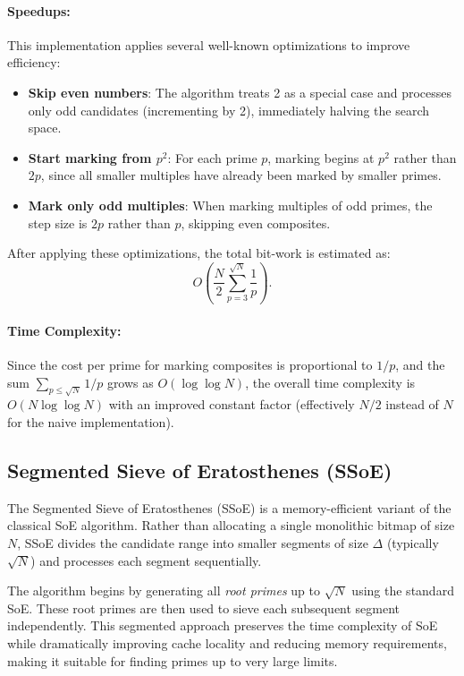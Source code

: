 \documentclass{article}
\begin{document}
\paragraph{Speedups:}
This implementation applies several well-known optimizations to improve efficiency:
\begin{itemize}[noitemsep]
    \item \textbf{Skip even numbers}: The algorithm treats 2 as a special case and processes only odd candidates (incrementing by 2), immediately halving the search space.
    \item \textbf{Start marking from $p^2$}: For each prime $p$, marking begins at $p^2$ rather than $2p$, since all smaller multiples have already been marked by smaller primes.
    \item \textbf{Mark only odd multiples}: When marking multiples of odd primes, the step size is $2p$ rather than $p$, skipping even composites.
\end{itemize}

After applying these optimizations, the total bit-work is estimated as:
\[
O\left(\frac{N}{2}\sum_{p=3}^{\sqrt N}\frac{1}{p}\right).
\]

\paragraph{Time Complexity:} Since the cost per prime for marking composites is proportional to $1/p$, and the sum $\sum_{p \le \sqrt{N}} 1/p$ grows as $O(\log \log N)$, the overall time complexity is $O(N \log \log N)$ with an improved constant factor (effectively $N/2$ instead of $N$ for the naive implementation).

\subsection{Segmented Sieve of Eratosthenes (SSoE)} \label{alg:ssoe}

The Segmented Sieve of Eratosthenes (SSoE) is a memory-efficient variant of the classical SoE algorithm. Rather than allocating a single monolithic bitmap of size $N$, SSoE divides the candidate range into smaller segments of size $\Delta$ (typically $\sqrt{N}$) and processes each segment sequentially. 

The algorithm begins by generating all \emph{root primes} up to $\sqrt{N}$ using the standard SoE. These root primes are then used to sieve each subsequent segment independently. This segmented approach preserves the time complexity of SoE while dramatically improving cache locality and reducing memory requirements, making it suitable for finding primes up to very large limits.
\end{document}
